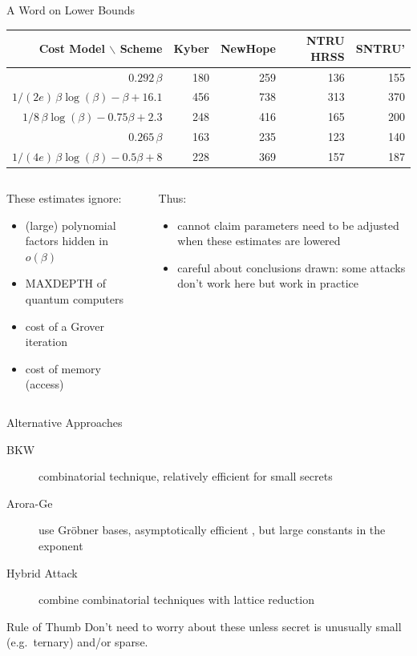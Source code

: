 \documentclass[xcolor=table,10pt,aspectratio=169]{beamer}
\def\enumworstfit{\(1/(2e)\, \beta \log(\beta) - \beta + 16.1\)}
\def\enumavgfit{\(1/8\,\beta \log(\beta) - 0.75\beta + 2.3\)}
\def\qenumworstfit{\(1/(4e)\, \beta \log(\beta) - 0.5\beta + 8\)}
\def\rore{\rowcolor{DarkRed!20}}
\begin{document}
\begin{frame}[label={sec:org523adb0}]{A Word on Lower Bounds}
\begin{center}
\small{
\begin{tabular}{rrrrr}
\textbf{Cost Model} $\backslash$ \textbf{Scheme} & \textbf{Kyber} & \textbf{NewHope} & \textbf{NTRU HRSS} & \textbf{SNTRU'}\\
\hline
\rore \(0.292\,β\) & 180 & 259 & 136 & 155\\
\enumworstfit & 456 & 738 & 313 & 370\\
\rore \enumavgfit & 248 & 416 & 165 & 200\\
\hline
\rore \(0.265\,\beta\) & 163 & 235 & 123 & 140\\
\rore \qenumworstfit & 228 & 369 & 157 & 187\\
\end{tabular}
}
\end{center}

\begin{columns}[t]
\begin{column}{0.5\columnwidth}
These estimates ignore:

\begin{itemize}
\item (large) polynomial factors hidden in \(o(\beta)\)
\item MAXDEPTH of quantum computers
\item cost of a Grover iteration
\item cost of memory (access)
\end{itemize}
\end{column}

\begin{column}{0.5\columnwidth}
Thus:

\begin{itemize}
\item cannot claim parameters need to be adjusted when these estimates are lowered
\item careful about conclusions drawn: some attacks don’t work here but work in practice
\end{itemize}
\end{column}
\end{columns}
\end{frame}


\begin{frame}[label={sec:org5a9728f}]{Alternative Approaches}
\begin{description}
\item[{BKW}] combinatorial technique, relatively efficient for small secrets
\item[{Arora-Ge}] use Gröbner bases, asymptotically efficient , but large constants in the exponent
\item[{Hybrid Attack}] combine combinatorial techniques with lattice reduction
\end{description}

\begin{alertblock}{Rule of Thumb}
Don’t need to worry about these unless secret is unusually small (e.g. ternary) and/or sparse.
\end{alertblock}
\end{frame}
\end{document}
